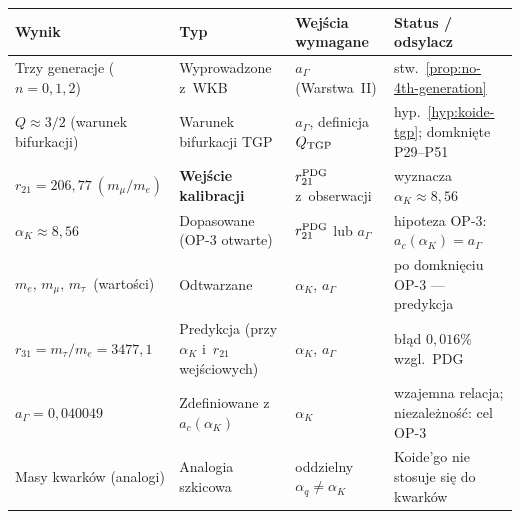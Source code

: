 \begin{center}\footnotesize
\begin{tabular}{@{}p{3.6cm}lp{3.2cm}p{3.0cm}@{}}
\toprule
\textbf{Wynik} & \textbf{Typ}
  & \textbf{Wej\'scia wymagane}
  & \textbf{Status / odsylacz} \\
\midrule

Trzy generacje ($n=0,1,2$)
  & Wyprowadzone z~WKB
  & $a_\Gamma$ (Warstwa~II)
  & stw.~\ref{prop:no-4th-generation} \\[4pt]

$Q \approx 3/2$ (warunek bifurkacji)
  & Warunek bifurkacji TGP
  & $a_\Gamma$, definicja $Q_{\rm TGP}$
  & hyp.~\ref{hyp:koide-tgp}; domkni\k{e}te P29--P51 \\[4pt]

$r_{21} = 206{,}77\ (m_\mu/m_e)$
  & \textbf{Wej\'scie kalibracji}
  & $r_{21}^{\rm PDG}$ z~obserwacji
  & wyznacza $\alpha_K \approx 8{,}56$ \\[4pt]

$\alpha_K \approx 8{,}56$
  & Dopasowane (OP-3 otwarte)
  & $r_{21}^{\rm PDG}$ lub $a_\Gamma$
  & hipoteza OP-3: $a_c(\alpha_K) = a_\Gamma$ \\[4pt]

$m_e,\, m_\mu,\, m_\tau$~(warto\'sci)
  & Odtwarzane
  & $\alpha_K$, $a_\Gamma$
  & po domkni\k{e}ciu OP-3 --- predykcja \\[4pt]

$r_{31} = m_\tau/m_e = 3477{,}1$
  & Predykcja (przy $\alpha_K$ i~$r_{21}$ wej\'sciowych)
  & $\alpha_K$, $a_\Gamma$
  & b\l{}\k{a}d $0{,}016\%$ wzgl.\ PDG \\[4pt]

$a_\Gamma = 0{,}040049$
  & Zdefiniowane z~$a_c(\alpha_K)$
  & $\alpha_K$
  & wzajemna relacja; niezale\.zno\'s\'c: cel OP-3 \\[4pt]

Masy kwark\'ow (analogi)
  & Analogia szkicowa
  & oddzielny $\alpha_q \neq \alpha_K$
  & Koide'go nie stosuje si\k{e} do kwark\'ow \\

\bottomrule
\end{tabular}
\end{center}


